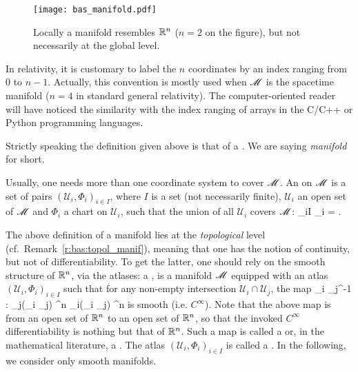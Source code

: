 \begin{figure}
\centerline{\texttt{[image: bas\_manifold.pdf]}}
\caption[]{\label{f:bas:manifold} \footnotesize
Locally a manifold resembles $\mathbb{R}^n$ ($n=2$ on the figure), but not necessarily at the global level.}
\end{figure}

\begin{remark}
In relativity, it is customary to label the $n$ coordinates by an index
ranging from $0$ to $n-1$. Actually, this convention is mostly used when $\mathscr{M}$ is the spacetime manifold ($n=4$ in standard general relativity). The computer-oriented reader will have noticed the similarity
with the index ranging of arrays in the C/C++ or Python programming languages.
\end{remark}


\begin{remark} \label{r:bas:topol_manif}
Strictly speaking the definition given above is that of a . We are saying \emph{manifold} for short.
\end{remark}


Usually, one needs more than one coordinate system to cover $\mathscr{M}$.
An  on $\mathscr{M}$ is a set of pairs
$(\mathscr{U}_i,\Phi_i)_{i\in I}$,  where $I$ is a set (not necessarily finite), $\mathscr{U}_i$ an open set of $\mathscr{M}$ and $\Phi_i$ a chart on $\mathscr{U}_i$,
such that the union of all $\mathscr{U}_i$ covers $\mathscr{M}$:
\be
    \bigcup_{i\in I} _i = \M.
\ee

The above definition of a manifold lies at the \emph{topological} level
(cf.~Remark~\ref{r:bas:topol_manif}), meaning that one has the notion of continuity, but not of differentiability. To get the latter, one should rely on the smooth structure of $\mathbb{R}^n$, via the atlases:
a ,
is a manifold $\mathscr{M}$ equipped with an atlas
$(\mathscr{U}_i,\Phi_i)_{i\in I}$ such that for any non-empty intersection
$\mathscr{U}_i \cap \mathscr{U}_j$, the map
\be \label{e:bas:transition_map}
    \Phi_i \circ \Phi_j^{-1} : \Phi_j(_i \cap {}_j)
    \subset \R^n \longrightarrow \Phi_i(_i \cap {}_j)
    \subset \R^n
\ee
is smooth (i.e. $C^\infty$).
Note that the above map is from an open set of $\mathbb{R}^n$ to an open set of $\mathbb{R}^n$, so that the
invoked $C^\infty$ differentiability is nothing but that of $\mathbb{R}^n$.
Such a map is called a  or, in the mathematical literature, a
.
The atlas $(\mathscr{U}_i,\Phi_i)_{i\in I}$  is called a
.
In the following, we consider only smooth manifolds.

